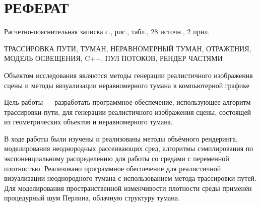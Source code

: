 \section*{РЕФЕРАТ}

Расчетно-пояснительная записка \pageref{LastPage} с.,  рис.,  табл., 28 источн., 2 прил.

ТРАССИРОВКА ПУТИ, ТУМАН, НЕРАВНОМЕРНЫЙ ТУМАН, ОТРАЖЕНИЯ, МОДЕЛЬ ОСВЕЩЕНИЯ, C++, ПУЛ ПОТОКОВ, РЕНДЕР ЧАСТЯМИ

Объектом исследования являются методы генерации реалистичного изображения сцены и методы визуализации неравномерного тумана в компьютерной графике

Цель работы --- разработать программное обеспечение, использующее алгоритм трассировки пути, для генерации реалистичного изображения сцены,
состоящей из геометрических объектов и неравномерного тумана.

В ходе работы были изучены и реализованы методы объёмного рендеринга, моделирования неоднородных рассеивающих сред,
алгоритмы сэмплирования по экспоненциальному распределению для работы со средами с переменной плотностью.
Реализовано программное обеспечение для реалистичной визуализации неоднородного тумана с использованием метода трассировки путей.
Для моделирования пространственной изменчивости плотности среды применён процедурный шум Перлина, облачную структуру тумана.